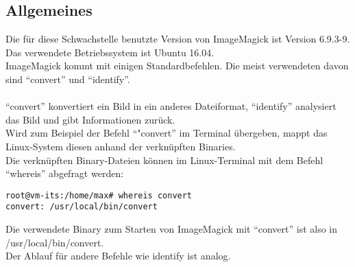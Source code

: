 \subsection{Allgemeines}\label{subsec:allgemeines}

Die für diese Schwachstelle benutzte Version von ImageMagick ist Version 6.9.3-9.\\
Das verwendete Betriebssystem ist Ubuntu 16.04.\\

ImageMagick kommt mit einigen Standardbefehlen.
Die meist verwendeten davon sind "`convert"' und "`identify"'.\\\\
"`convert"' konvertiert ein Bild in ein anderes Dateiformat, "`identify"' analysiert das Bild und gibt Informationen zurück.\\

Wird zum Beispiel der Befehl "`"convert"' im Terminal übergeben, mappt das Linux-System diesen anhand der verknüpften Binaries.\\

Die verknüpften Binary-Dateien können im Linux-Terminal mit dem Befehl "`whereis"' abgefragt werden:\\

\begin{lstlisting}[language=Text, caption=whereis Binary Abfrage,label={lst:lstlisting}]
root@vm-its:/home/max# whereis convert
convert: /usr/local/bin/convert
\end{lstlisting}
\vspace{5mm}

Die verwendete Binary zum Starten von ImageMagick mit "`convert"' ist also in \\/usr/local/bin/convert.\\
Der Ablauf für andere Befehle wie identify ist analog.\\